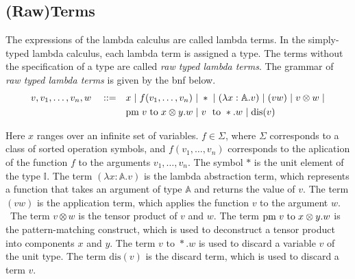 \subsection{(Raw)Terms}


The expressions of the lambda calculus are called lambda terms. In the simply-typed lambda calculus, each lambda term is assigned a type. The terms without the specification of a type are called \emph{raw typed lambda terms}. The grammar of \emph{raw typed lambda terms} is given by the \acrshort{bnf} below.
\begin{equation*} \label{eq:grammarlambda}
\begin{split}
 v,v_1, \ldots, v_n,w \hspace{10 pt} ::= \hspace{10 pt}& x \hspace{3 pt} \vert \hspace{3 pt} f(v_1, \ldots, v_n) \hspace{3 pt} \vert \hspace{3 pt} *  \hspace{3 pt} \vert \hspace{3 pt} (\lambda x: \mathbb{A}. v )\hspace{3 pt} \vert \hspace{3 pt} (v w) \hspace{3 pt}  \vert \hspace{3 pt} v \otimes w \hspace{3 pt} \vert
 \\&    \text{pm} \hspace{3 pt} v \hspace{3 pt} \text{to} \hspace{3 pt} x \otimes y. w  \hspace{3 pt}  \vert \hspace{3 pt} v \hspace{3 pt} \text{ to } *.w \hspace{3 pt} \vert \hspace{3 pt} \text{dis}(v)
\end{split}
\end{equation*}

Here $x$ ranges over an infinite set of variables. $f \in \Sigma$, where  $\Sigma$ corresponds to a class of sorted operation symbols, and $f(v_1, \ldots, v_n)$ corresponds to the aplication of the function $f$ to the arguments $v_1, \ldots, v_n$. The symbol $*$ is the unit element of the type $\mathbb{I}$. The term $(\lambda x: \mathbb{A}. v )$ is the lambda abstraction term, which represents a function that takes an argument of type $\mathbb{A}$ and returns the value of $v$. The term $(v w)$ is the application term, which applies the function $v$ to the argument $w$.  The term $v \otimes w$ is the tensor product of $v$ and $w$. The term $\text{pm} \hspace{3 pt} v \hspace{3 pt} \text{to} \hspace{3 pt} x \otimes y. w$ is the pattern-matching construct, which is used to deconstruct a tensor product into components $x$ and $y$. The term $v \text{ to } *.w$ is used to discard a variable $v$ of the unit type. The term $\text{dis}(v)$ is the discard term, which is used to discard a term $v$. 

